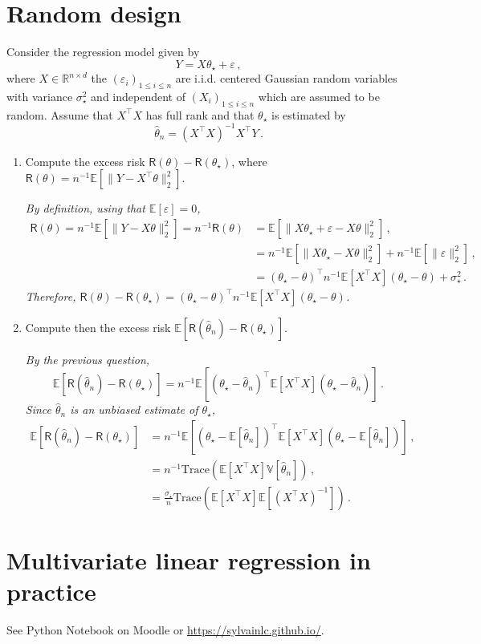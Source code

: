 \documentclass[a4paper,10pt,fleqn]{article}
\newcommand{\eqsp}{\,}
\newcommand{\rset}{\ensuremath{\mathbb{R}}}
\newcommand{\1}{\ensuremath{\mathbbm{1}}}
\newcommand{\bE}{\mathbb{E}}
\newcommand{\param}{\theta}
\begin{document}
\section{Random design}
Consider the regression model given by
$$
Y = X\param_{\star}+ \varepsilon\eqsp,
$$
where $X\in\rset^{n\times d}$ the $(\varepsilon_{i})_{1\leqslant i \leqslant n}$ are i.i.d. centered Gaussian random variables with variance $\sigma_{\star}^2$ and independent of $(X_{i})_{1\leqslant i \leqslant n}$ which are assumed to be random. Assume that $X^\top X$ has full rank and that $\param_\star$ is estimated by 
$$
\widehat \param_n = (X^\top X)^{-1}X^\top Y\eqsp.
$$
\begin{enumerate}
\item  Compute the excess risk $\mathsf{R}(\param)-\mathsf{R}(\param_\star)$, where $\mathsf{R}(\param) = n^{-1}\bE[\|Y - X^\top \param\|_2^2]$.

\vspace{.2cm}

{\em
By definition, using that $\bE[\varepsilon]=0$,
\begin{align*}
\mathsf{R}(\param) = n^{-1}\bE[\|Y - X \param\|_2^2] = n^{-1}\mathsf{R}(\param) &= \bE[\|X\param_\star + \varepsilon - X\param\|_2^2]\eqsp,\\
&= n^{-1}\bE[\|X \param_\star - X\param\|_2^2] + n^{-1}\bE[\|\varepsilon\|_2^2]\eqsp,\\
&=(\param_\star - \param)^\top n^{-1}\bE[X^\top X](\param_\star - \param) + \sigma_\star^2\eqsp.
\end{align*}
Therefore, $\mathsf{R}(\param)-\mathsf{R}(\param_\star) = (\param_\star - \param)^\top n^{-1}\bE[X^\top X](\param_\star - \param) $.
}
\item  Compute then the excess risk $\bE[\mathsf{R}(\widehat \param_n)-\mathsf{R}(\param_\star)]$.

\vspace{.2cm}

{\em
By the previous question,
$$
\bE[\mathsf{R}(\widehat \param_n)-\mathsf{R}(\param_\star)] = n^{-1}\bE[(\param_\star - \widehat \param_n)^\top \bE[X^\top X](\param_\star - \widehat \param_n) ]\eqsp.
$$
Since $\widehat \param_n$ is an unbiased estimate of $\param_\star$,
\begin{align*}
\bE[\mathsf{R}(\widehat \param_n)-\mathsf{R}(\param_\star)] &= n^{-1}\bE[(\param_\star - \bE[\widehat \param_n])^\top \bE[X^\top X](\param_\star - \bE[\widehat \param_n]) ]\eqsp,\\
&= n^{-1}\mathrm{Trace}\left(\bE[X^\top X]\mathbb{V}[\widehat \param_n]\right)\eqsp,\\
&=\frac{\sigma_\star}{n}\mathrm{Trace}\left(\bE[X^\top X]\bE\left[(X^\top X)^{-1}\right]\right)\eqsp.
\end{align*}
}

\end{enumerate}

\section{Multivariate linear regression in practice}

See Python Notebook on Moodle or \url{https://sylvainlc.github.io/}.
\end{document}
